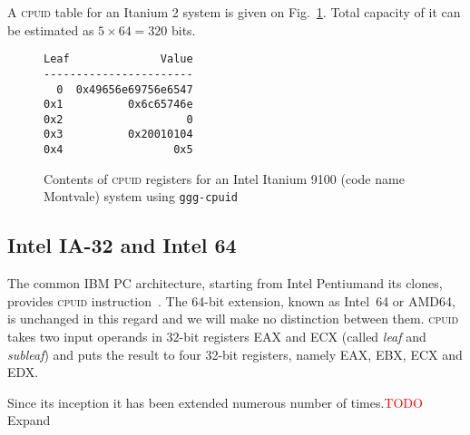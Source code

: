 \documentclass[a4paper,10pt,oneside,unicode]{article}
\newcommand{\cpuid}{\textsc{cpuid} }
\newcommand{\todo}[1][]{\textcolor{red}{TODO #1}}
\begin{document}
A \cpuid table for an Itanium 2 system is given on Fig.~\ref{fig:itanium-cpuid}. Total capacity of it can be estimated as $5 \times 64 = 320$ bits.

\begin{figure}
    \centering
\begin{verbatim}
Leaf              Value
-----------------------
  0  0x49656e69756e6547
0x1          0x6c65746e
0x2                   0
0x3          0x20010104
0x4                 0x5
\end{verbatim}
    
\caption{Contents of \cpuid registers for an Intel Itanium 9100 (code name Montvale) system using \texttt{ggg-cpuid}~\cite{ggg-cpuid}}\label{fig:itanium-cpuid}
\end{figure} 

%



\subsection{Intel IA-32 and Intel 64}

The common IBM PC architecture, starting from Intel Pentium\texttrademark and its clones, provides \cpuid instruction~\cite{intelmanual-7vols, amd-sdm-vol1}. The 64-bit extension, known as Intel~64 or AMD64, is unchanged in this regard and we will make no distinction between them. \cpuid takes two input operands in 32-bit registers EAX and ECX (called \textit{leaf} and \textit{subleaf}) and puts the result to four 32-bit registers, namely EAX, EBX, ECX and EDX.

Since its inception it has been extended numerous number of times.\todo{Expand}
\end{document}
